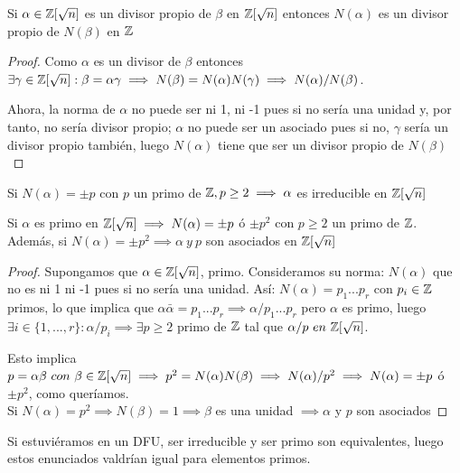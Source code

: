 \begin{nprop}
	Si $\alpha \in \mathbb{Z}[\sqrt n]$ es un divisor propio de $\beta$ en $\mathbb{Z}[\sqrt n]$ entonces $N(\alpha)$ es un divisor propio de $N(\beta)$ en $\mathbb{Z}$
\end{nprop}
\begin{proof}
	Como $\alpha$ es un divisor de $\beta$ entonces $\exists \gamma \in \mathbb{Z}[\sqrt n] : \beta = \alpha \gamma \implies N(\beta) = N(\alpha)N(\gamma) \implies N(\alpha)/N(\beta)$.

	Ahora, la norma de $\alpha$ no puede ser ni 1, ni -1 pues si no sería una unidad y, por tanto, no sería divisor propio; $\alpha$ no puede ser un asociado pues si no, $\gamma$ sería un divisor propio también, luego $N(\alpha)$ tiene que ser un divisor propio de $N(\beta)$

\end{proof}
\begin{ncor}
	Si $N(\alpha) = \pm p$ con $p $ un primo de $\mathbb{Z}, p\geq 2\implies \alpha$ es irreducible en $\mathbb{Z}[\sqrt n]$
\end{ncor}
\begin{ncor}
	Si $\alpha$ es primo en $\mathbb{Z}[\sqrt n]\implies N(\alpha) = \pm p $ ó $\pm p^2$ con $p \geq 2 $ un primo de $\mathbb{Z}$. Además, si $N(\alpha) = \pm p^2 \implies \alpha \ y \ p$ son asociados en $\mathbb{Z}[\sqrt n]$
\end{ncor}
\begin{proof}
	Supongamos que $\alpha \in \mathbb{Z}[\sqrt n]$, primo. Consideramos su norma: $N(\alpha)$ que no es ni 1 ni -1 pues si no sería una unidad. Así: $N(\alpha) = p_1...p_r$ con $p_i\in \mathbb{Z}$ primos, lo que implica que $\alpha \bar{\alpha} = p_1...p_r \implies \alpha/p_1...p_r $ pero $\alpha$ es primo, luego $\exists i \in \{1,...,r\}: \alpha / p_i \implies \exists p \geq 2 $ primo de $\mathbb{Z}$ tal que $\alpha / p \ en \ \mathbb{Z}[\sqrt n]$.

	 Esto implica $p = \alpha \beta \ con \ \beta \in \ent[\sqrt n] \implies p^2 = N(\alpha) N(\beta) \implies N(\alpha)/p^2 \implies N(\alpha) = \pm p$ ó $\pm p^2$, como queríamos.\\
	 Si $N(\alpha) = p^2 \implies N(\beta) = 1 \implies \beta$ es una unidad $\implies \alpha$ y $p$ son asociados
\end{proof}
\begin{nota}
	Si estuviéramos en un DFU, ser irreducible y ser primo son equivalentes, luego estos enunciados valdrían igual para elementos primos.
\end{nota}

